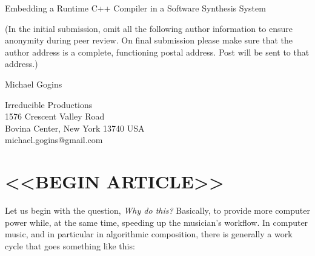 \documentclass[letterpaper, 12pt]{article}
\begin{document}
{\cmjTitle Embedding a Runtime C++ Compiler in a Software Synthesis System}
\vspace*{24pt}

(In the initial submission, omit all the following author information to ensure anonymity during peer review.
On final submission please make sure that the author address is a complete, functioning postal address.
Post will be sent to that address.)

{\cmjAuthor Michael Gogins}	%
 
\begin{cmjAuthorAddress}
	Irreducible Productions\\
	1576 Crescent Valley Road\\
	Bovina Center, New York 13740 USA\\		%
	michael.gogins@gmail.com
\end{cmjAuthorAddress}


\begin{abstract}
	This article considers why musicians and researchers might want to use a C++ compiler embedded in a software synthesis system (SWSS), and how such a compiler can be implemented and used, by presenting new opcodes for the Csound SWSS that embed the Clang/LLVM on-request compiler (ORC). C++ source code may be embedded in a regular Csound orchestra file, compiled by the \texttt{Clang\_compile} opcode, and invoked during performance by the \texttt{Clang\_invoke} opcode. Uses include writing new signal processing and synthesis code in C++ right in the SWSS, full-strength algorithmic composition right in the SWSS, calling into external dynamic link libraries right from the SWSS, creating native user interfaces for a piece right in the SWSS, and more. The technology and patterns presented here could be adapted for use in any SWSS that supports the C calling convention. 
\end{abstract}

\section{<<BEGIN ARTICLE>>}
Let us begin with the question, \textit{Why do this?} Basically, to provide more computer power while, at the same time, speeding up the musician's workflow. In computer music, and in particular in algorithmic composition, there is generally a work cycle that goes something like this:
\end{document}
